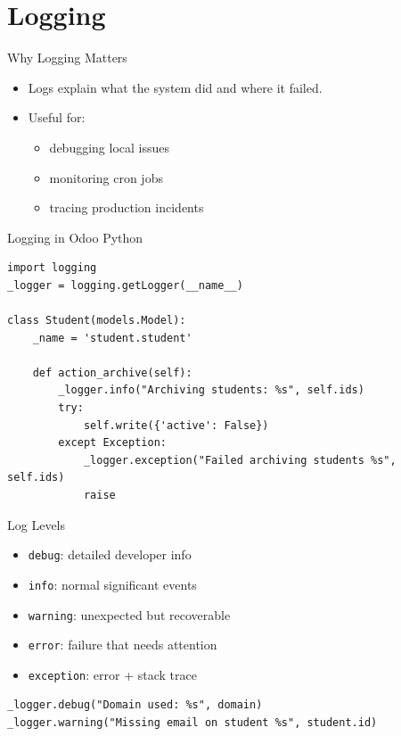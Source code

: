 \section{Logging}

\begin{frame}[fragile]{Why Logging Matters}
	\begin{itemize}
		\item Logs explain what the system did and where it failed.
		\item Useful for:
		\begin{itemize}
			\item debugging local issues
			\item monitoring cron jobs
			\item tracing production incidents
		\end{itemize}
	\end{itemize}
\end{frame}

\begin{frame}[fragile]{Logging in Odoo Python}
\begin{lstlisting}
import logging
_logger = logging.getLogger(__name__)

class Student(models.Model):
	_name = 'student.student'

	def action_archive(self):
		_logger.info("Archiving students: %s", self.ids)
		try:
			self.write({'active': False})
		except Exception:
			_logger.exception("Failed archiving students %s", self.ids)
			raise
\end{lstlisting}
\end{frame}

\begin{frame}[fragile]{Log Levels}
	\begin{itemize}
		\item \texttt{debug}: detailed developer info
		\item \texttt{info}: normal significant events
		\item \texttt{warning}: unexpected but recoverable
		\item \texttt{error}: failure that needs attention
		\item \texttt{exception}: error + stack trace
	\end{itemize}
\begin{lstlisting}
_logger.debug("Domain used: %s", domain)
_logger.warning("Missing email on student %s", student.id)
\end{lstlisting}
\end{frame}

